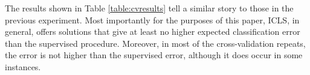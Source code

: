 \documentclass{llncs}
\begin{document}

The results shown in Table \ref{table:cvresults} tell a similar story to those in the previous experiment. Most importantly for the purposes of this paper, ICLS, in general, offers solutions that give at least no higher expected classification error than the supervised procedure. Moreover, in most of the cross-validation repeats, the error is not higher than the supervised error, although it does occur in some instances. 
\end{document}
